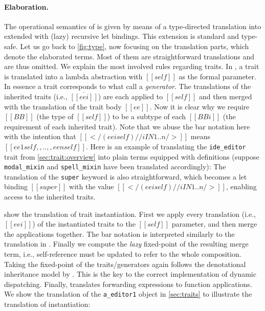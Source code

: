 \paragraph{Elaboration.}

The operational semantics of \sedel is given by means of a type-directed
translation into \fnamee extended with (lazy) recursive let bindings.
This extension is standard and type-safe. Let us go back to
\cref{fig:type}, now focusing on the translation parts, which
denote the elaborated \fnamee terms. Most of them
are straightforward translations and are thus omitted. We explain the most
involved rules regarding traits. In , a trait is translated into
a lambda abstraction with $[[self]]$ as the formal parameter.
In essence a trait corresponds to what \citet{cook1989denotational} call a \emph{generator}.
 The translations
of the inherited traits (i.e., $\overline{[[eei]]}$) are each applied to
$[[self]]$ and then merged with the translation of the trait body $[[ee]]$. Now
it is clear why we require $[[BB]]$ (the type of $[[self]]$) to be a subtype of each
$[[BBi]]$ (the requirement of each inherited trait). Note that we abuse the bar
notation here with the intention that $[[</ (eei self) // i IN 1..n />]]$ means
$[[ee1 self ,, .. ,, een self]]$.
Here is an example of translating the \lstinline{ide_editor} trait from \cref{sec:trait:overview} into
plain \fnamee terms equipped with definitions (suppose \lstinline{modal_mixin} and \lstinline{spell_mixin}
have been translated accordingly):
The translation of the \lstinline{super} keyword is also straightforward, which becomes a let binding
$[[super]]$ with the value $[[</ (eei self) // i IN 1..n />]]$, enabling access to the inherited traits.

 show the translation of trait instantiation.
First we apply every translation (i.e., $[[eei]]$) of the instantiated traits to the $[[self]]$ parameter,
and then merge the applications together. The bar notation is
interpreted similarly to the translation in . Finally we compute the \emph{lazy}
fixed-point of the resulting merge term, i.e., self-reference must be updated to refer to
the whole composition. Taking the fixed-point of the
traits/generators again follows the denotational inheritance model by \citet{cook1989denotational}.
 This is the key to the correct implementation of dynamic
 dispatching. Finally,
 translates forwarding expressions to function
applications. We show the translation of the
\lstinline{a_editor1} object in \cref{sec:traits} to illustrate the
translation of instantiation:

